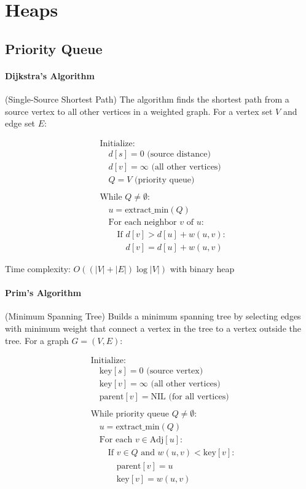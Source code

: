 \section{Heaps}

\subsection{Priority Queue}

\paragraph{Dijkstra's Algorithm} (Single-Source Shortest Path)
The algorithm finds the shortest path from a source vertex to all other vertices in a weighted graph. For a vertex set \( V \) and edge set \( E \):


\begin{align*}
& \text{Initialize:} \\
& \quad d[s] = 0 \text{ (source distance)} \\
& \quad d[v] = \infty \text{ (all other vertices)} \\
& \quad Q = V \text{ (priority queue)} \\
\\
& \text{While } Q \neq \emptyset: \\
& \quad u = \text{extract\_min}(Q) \\
& \quad \text{For each neighbor } v \text{ of } u: \\
& \quad \quad \text{If } d[v] > d[u] + w(u,v): \\
& \quad \quad \quad d[v] = d[u] + w(u,v)
\end{align*}
    


Time complexity: \( O((|V| + |E|)\log|V|) \) with binary heap

\paragraph{Prim's Algorithm} (Minimum Spanning Tree)
Builds a minimum spanning tree by selecting edges with minimum weight that connect a vertex in the tree to a vertex outside the tree. For a graph \( G=(V,E) \):


\begin{align*}
& \text{Initialize:} \\
& \quad \text{key}[s] = 0 \text{ (source vertex)} \\
& \quad \text{key}[v] = \infty \text{ (all other vertices)} \\
& \quad \text{parent}[v] = \text{NIL} \text{ (for all vertices)} \\
\\
& \text{While priority queue } Q \neq \emptyset: \\
& \quad u = \text{extract\_min}(Q) \\
& \quad \text{For each } v \in \text{Adj}[u]: \\
& \quad \quad \text{If } v \in Q \text{ and } w(u,v) < \text{key}[v]: \\
& \quad \quad \quad \text{parent}[v] = u \\
& \quad \quad \quad \text{key}[v] = w(u,v)
\end{align*}



